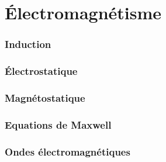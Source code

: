 \setcounter{part}{13}  %

\part{\'Electromagnétisme}
\section{Induction}







\section{\'Electrostatique}







\section{Magnétostatique}




\section{Equations de Maxwell}



\section{Ondes électromagnétiques}














